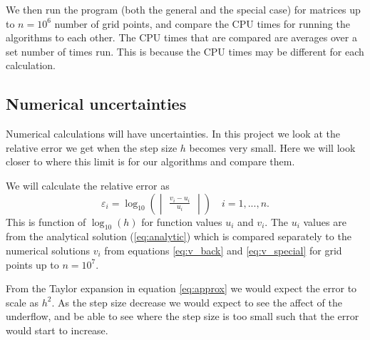 \documentclass[12pt,a4paper,english]{article}
\begin{document}
We then run the program (both the general and the special case) for matrices up to $n=10^6$ number of grid points, and compare the CPU times for running the algorithms to each other. The CPU times that are compared are averages over a set number of times run. This is because the CPU times may be different for each calculation.

\subsection{Numerical uncertainties}
Numerical calculations will have uncertainties. In this project we look at the relative error we get when the step size $h$ becomes very small. Here we will look closer to where this limit is for our algorithms and compare them.

We will calculate the relative error as
\begin{equation}
\label{eq:rel_error}
\varepsilon_i=\log_{10}\left(\begin{vmatrix}
\frac{v_i-u_i}{u_i}
\end{vmatrix}\right)\quad i=1,...,n.
\end{equation}
This is function of $\log_{10}(h)$ for function values $u_i$ and $v_i$. The $u_i$ values are from the analytical solution (\ref{eq:analytic}) which is compared separately to the numerical solutions $v_i$ from equations \ref{eq:v_back} and \ref{eq:v_special} for grid points up to $n=10^7$.

From the Taylor expansion in equation \ref{eq:approx} we would expect the error to scale as $h^2$. As the step size decrease we would expect to see the affect of the underflow, and be able to see where the step size is too small such that the error would start to increase.
\end{document}
